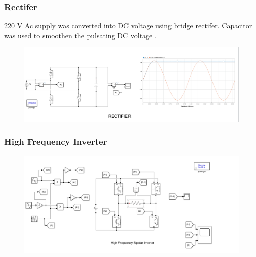 \documentclass{beamer}
\begin{document}
\begin{frame}
  \frametitle{Rectifer}
  220 V Ac supply was converted into DC voltage using bridge rectifer. Capacitor was used to smoothen the pulsating DC voltage . 
\begin{figure}[]
  \centering
  \includegraphics[scale=0.3]{jpgs/rectifier.png}  
\end{figure}
\end{frame}

\begin{frame}
  \frametitle{High Frequency Inverter}
    \begin{figure}[htbp]
      \centering
      \includegraphics[scale=0.4]{jpgs/inverter.png}
    \end{figure}
\end{frame}
\end{document}
